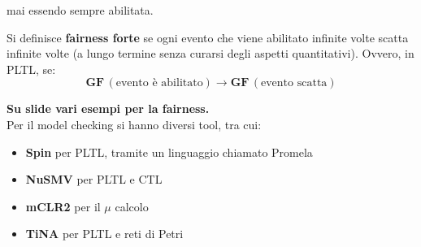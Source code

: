 mai essendo sempre abilitata.
\begin{definizione}
  Si definisce \textbf{fairness forte} se ogni evento che viene abilitato
  infinite volte scatta infinite volte (a lungo termine senza curarsi degli
  aspetti quantitativi). Ovvero, in PLTL, se:
  \[\mathbf{GF}\,(\mbox{evento è abilitato})\to\mathbf{GF}\,(\mbox{evento
      scatta})\] 
\end{definizione}
\textbf{Su slide vari esempi per la fairness.}\\
Per il model checking si hanno diversi tool, tra cui:
\begin{itemize}
  \item \textbf{Spin} per PLTL, tramite un linguaggio chiamato Promela
  \item \textbf{NuSMV} per PLTL e CTL
  \item \textbf{mCLR2} per il $\mu$ calcolo
  \item \textbf{TiNA} per PLTL e reti di Petri
\end{itemize}